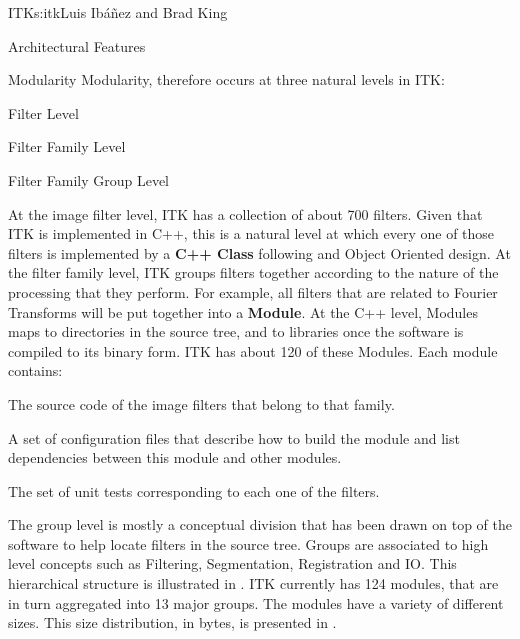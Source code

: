 \begin{aosachapter}{ITK}{s:itk}{Luis Ib\'{a}\~{n}ez and Brad King}
\begin{aosasect1}{Architectural Features}
\begin{aosasect2}{Modularity}
Modularity, therefore occurs at three natural levels in ITK:

\begin{aosaitemize}
\item Filter Level
\item Filter Family Level
\item Filter Family Group Level
\end{aosaitemize}

At the image filter level, ITK has a collection of about 700 filters. Given
that ITK is implemented in C++, this is a natural level at which every one of
those filters is implemented by a \textbf{C++ Class} following and Object
Oriented design.  At the filter family level, ITK groups filters together
according to the nature of the processing that they perform. For example, all
filters that are related to Fourier Transforms will be put together into a
\textbf{Module}.  At the C++ level, Modules maps to directories in the
source tree, and to libraries once the software is compiled to its
binary form. ITK has about 120 of these Modules. Each module contains:

\begin{aosaenumerate}

\item The source code of the image filters that belong to that family.

\item A set of configuration files that describe how to build the module and
list dependencies between this module and other modules.

\item The set of unit tests corresponding to each one of the filters.

\end{aosaenumerate}


The group level is mostly a conceptual division that has been drawn on top of
the software to help locate filters in the source tree. Groups are associated
to high level concepts such as Filtering, Segmentation, Registration and IO.
This hierarchical structure is illustrated in
.  ITK currently has 124 modules, that are
in turn aggregated into 13 major groups.  The modules have a variety of
different sizes. This size distribution, in bytes, is presented in
.


\end{aosasect2}
\end{aosasect1}
\end{aosachapter}
